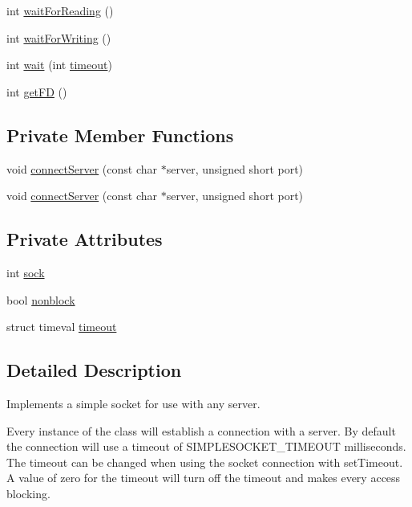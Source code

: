 \begin{DoxyCompactItemize}
\item 
int \hyperlink{classSimpleSocket_af9db6aa7c5c95cd00593cd73634a6adc}{wait\-For\-Reading} ()
\item 
int \hyperlink{classSimpleSocket_a27211c208598898ac3fcd9dd4b8dcd78}{wait\-For\-Writing} ()
\item 
int \hyperlink{classSimpleSocket_aa140f9d5c79130bd98da84a61cc2b285}{wait} (int \hyperlink{classSimpleSocket_ac2e777bd36689f4f136b9c5b9e9c5f0e}{timeout})
\item 
int \hyperlink{classSimpleSocket_abfe8170623b9a86f384433c37bae362d}{get\-F\-D} ()
\end{DoxyCompactItemize}
\subsection*{Private Member Functions}
\begin{DoxyCompactItemize}
\item 
void \hyperlink{classSimpleSocket_af082077fc1f725d9ba64f0ac429d02c8}{connect\-Server} (const char $\ast$server, unsigned short port)
\item 
void \hyperlink{classSimpleSocket_af082077fc1f725d9ba64f0ac429d02c8}{connect\-Server} (const char $\ast$server, unsigned short port)
\end{DoxyCompactItemize}
\subsection*{Private Attributes}
\begin{DoxyCompactItemize}
\item 
int \hyperlink{classSimpleSocket_a23557ce4b09fc521787340f38126b92e}{sock}
\item 
bool \hyperlink{classSimpleSocket_abbc193b9005628c260a53e864e6785cb}{nonblock}
\item 
struct timeval \hyperlink{classSimpleSocket_ac2e777bd36689f4f136b9c5b9e9c5f0e}{timeout}
\end{DoxyCompactItemize}


\subsection{Detailed Description}
Implements a simple socket for use with any server.

Every instance of the class will establish a connection with a server. By default the connection will use a timeout of S\-I\-M\-P\-L\-E\-S\-O\-C\-K\-E\-T\-\_\-\-T\-I\-M\-E\-O\-U\-T milliseconds. The timeout can be changed when using the socket connection with set\-Timeout. A value of zero for the timeout will turn off the timeout and makes every access blocking.

